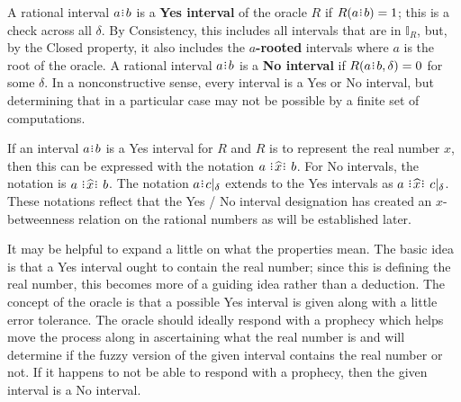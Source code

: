 \documentclass[12pt]{article}
\begin{document}
A rational interval $a\rint b$ is a \textbf{Yes interval} of the oracle $R$ if $R(a\rint b) = 1$; this is a check across all $\delta$. By Consistency, this includes all intervals that are in  $\mathbb{I}_R$, but, by the Closed property, it also includes the \textbf{$a$-rooted} intervals where $a$ is the root of the oracle.   A rational interval $a\rint b$ is a \textbf{No interval} if $R(a\rint b, \delta) = 0$ for some $\delta$. In a nonconstructive sense, every interval is a Yes or No interval, but determining that in a particular case may not be possible by a finite set of computations. 

If an interval $a\rint b$ is a Yes interval for $R$ and $R$ is to represent the real number $x$, then this can be expressed with the notation $a \xora b$. For No intervals, the notation is \sout{$a \xora b$}. The notation $a\rint c|_\delta$ extends to the Yes intervals as $a \xora c|_\delta$. These notations reflect that the Yes / No interval designation has created an $x$-betweenness relation on the rational numbers as will be established later.

It may be helpful to expand a little on what the properties mean. The basic idea is that a Yes interval ought to contain the real number; since this is defining the real number, this becomes more of a guiding idea rather than a deduction. The concept of the oracle is that a possible Yes interval is given along with a little error tolerance. The oracle should ideally respond with a prophecy which helps move the process along in ascertaining what the real number is and will determine if the fuzzy version of the given interval contains the real number or not. If it happens to not be able to respond with a prophecy, then the given interval is a No interval. 
\end{document}
